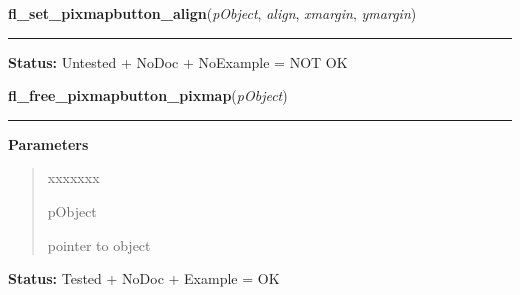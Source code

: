 \hspace{.8\funcindent}\begin{boxedminipage}{\funcwidth}

    \raggedright \textbf{fl\_set\_pixmapbutton\_align}(\textit{pObject}, \textit{align}, \textit{xmargin}, \textit{ymargin})

    \vspace{-1.5ex}

    \rule{\textwidth}{0.5\fboxrule}
\setlength{\parskip}{2ex}
\setlength{\parskip}{1ex}
\textbf{Status:} Untested + NoDoc + NoExample = NOT OK



    \end{boxedminipage}

    \label{xformslib:library:fl_free_pixmap_pixmap}

    \vspace{0.5ex}

\hspace{.8\funcindent}\begin{boxedminipage}{\funcwidth}

    \raggedright \textbf{fl\_free\_pixmapbutton\_pixmap}(\textit{pObject})

    \vspace{-1.5ex}

    \rule{\textwidth}{0.5\fboxrule}
\setlength{\parskip}{2ex}
\setlength{\parskip}{1ex}
      \textbf{Parameters}
      \vspace{-1ex}

      \begin{quote}
        \begin{Ventry}{xxxxxxx}

          \item[pObject]

          pointer to object

        \end{Ventry}

      \end{quote}

\textbf{Status:} Tested + NoDoc + Example = OK



    \end{boxedminipage}

    \label{xformslib:library:fl_set_pixmap_file}

